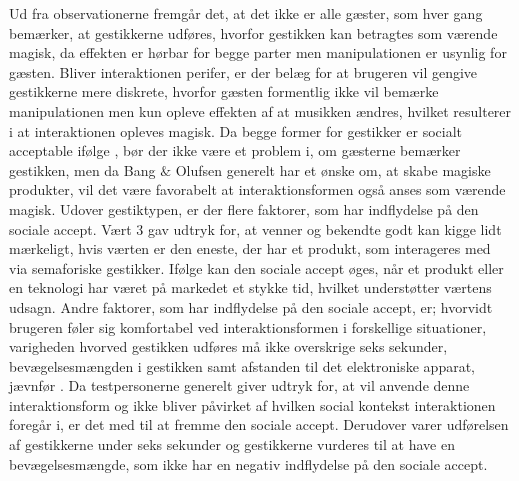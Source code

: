 Ud fra observationerne fremgår det, at det ikke er alle gæster, som hver gang bemærker, at gestikkerne udføres, hvorfor gestikken kan betragtes som værende magisk, da effekten er hørbar for begge parter men manipulationen er usynlig for gæsten. Bliver interaktionen perifer, er der belæg for at brugeren vil gengive gestikkerne mere diskrete, hvorfor gæsten formentlig ikke vil bemærke manipulationen men kun opleve effekten af at musikken ændres, hvilket resulterer i at interaktionen opleves magisk. Da begge former for gestikker er socialt acceptable ifølge \textcite[s. 277]{PDF:WouldYouDoThat}, bør der ikke være et problem i, om gæsterne bemærker gestikken, men da Bang $\&$ Olufsen generelt har et ønske om, at skabe magiske produkter, vil det være favorabelt at interaktionsformen også anses som værende magisk.\blankline
%
Udover gestiktypen, er der flere faktorer, som har indflydelse på den sociale accept. Vært 3 gav udtryk for, at venner og bekendte godt kan kigge lidt mærkeligt, hvis værten er den eneste, der har et produkt, som interageres med via semaforiske gestikker. Ifølge \textcite[s. 276]{PDF:WouldYouDoThat} kan den sociale accept øges, når et produkt eller en teknologi har været på markedet et stykke tid, hvilket understøtter værtens udsagn. Andre faktorer, som har indflydelse på den sociale accept, er; hvorvidt brugeren føler sig komfortabel ved interaktionsformen i forskellige situationer, varigheden hvorved gestikken udføres må ikke overskrige seks sekunder, bevægelsesmængden i gestikken samt afstanden til det elektroniske apparat, jævnfør . Da testpersonerne generelt giver udtryk for, at vil anvende denne interaktionsform og ikke bliver påvirket af hvilken social kontekst interaktionen foregår i, er det med til at fremme den sociale accept. Derudover varer udførelsen af gestikkerne under seks sekunder og gestikkerne vurderes til at have en bevægelsesmængde, som ikke har en negativ indflydelse på den sociale accept. 

